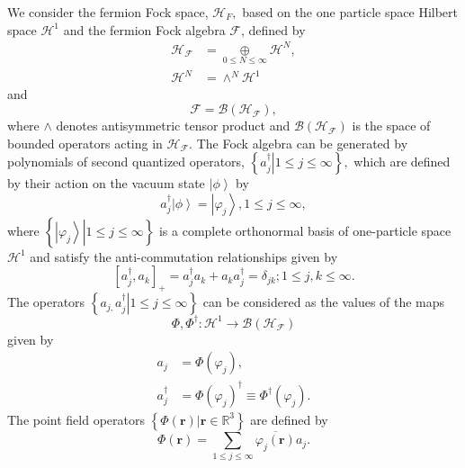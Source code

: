 \documentclass[aps,preprint]{revtex4}%
\begin{document}
We consider the fermion Fock space, $\mathcal{H}_{F},$ based on the one
particle space Hilbert space $\mathcal{H}^{1}$ and the fermion Fock algebra
$\mathcal{F}$, defined by
\begin{align}
\mathcal{H}_{\mathcal{F}}  &  =\underset{0\leq N\leq\infty}{\oplus}%
\mathcal{H}^{N},\\
\mathcal{H}^{N}  &  =\wedge^{N}\mathcal{H}^{1}%
\end{align}
and
\begin{equation}
\mathcal{F}=\mathcal{B}\left(  \mathcal{H}_{\mathcal{F}}\right)  ,
\end{equation}
where $\wedge$ denotes antisymmetric tensor product and $\mathcal{B}\left(
\mathcal{H}_{\mathcal{F}}\right)  $ is the space of bounded operators acting
in $\mathcal{H}_{\mathcal{F}}$. The Fock algebra can be generated by
polynomials of second quantized operators, $\left\{  \left.  a_{j}^{\dagger
}\right\vert 1\leq j\leq\infty\right\}  ,$ which are defined by their action
on the vacuum state $\left\vert \phi\right\rangle $ by
\begin{equation}
a_{j}^{\dagger}\left\vert \phi\right\rangle =\left\vert \varphi_{j}%
\right\rangle ,1\leq j\leq\infty,
\end{equation}
where $\left\{  \left.  \left\vert \varphi_{j}\right\rangle \right\vert 1\leq
j\leq\infty\right\}  $ is a complete orthonormal basis of one-particle space
$\mathcal{H}^{1}$ and satisfy the anti-commutation relationships given by
\begin{equation}
\left[  a_{j}^{\dagger},a_{k}\right]  _{+}=a_{j}^{\dagger}a_{k}+a_{k}%
a_{j}^{\dagger}=\delta_{jk};1\leq j,k\leq\infty.
\end{equation}
The operators $\left\{  \left.  a_{j,}a_{j}^{\dagger}\right\vert 1\leq
j\leq\infty\right\}  $ can be considered as the values of the maps
\begin{equation}
\Phi,\Phi^{\dagger}:\mathcal{H}^{1}\rightarrow\mathcal{B}\left(
\mathcal{H}_{\mathcal{F}}\right)
\end{equation}
given by
\begin{align}
a_{j}  &  =\Phi\left(  \varphi_{j}\right)  ,\\
a_{j}^{\dagger}  &  =\Phi\left(  \varphi_{j}\right)  ^{\dagger}\equiv
\Phi^{\dagger}\left(  \varphi_{j}\right)  .
\end{align}
The point field operators $\left\{  \left.  \Phi\left(  \boldsymbol{r}\right)
\right\vert \boldsymbol{r\in}\mathbb{R}^{3}\right\}  $ are defined by
\cite{Thirring}
\begin{equation}
\Phi\left(  \boldsymbol{r}\right)  =\sum_{1\leq j\leq\infty}\overline
{\varphi_{j}\left(  \boldsymbol{r}\right)  }a_{j}.
\end{equation}
\end{document}

